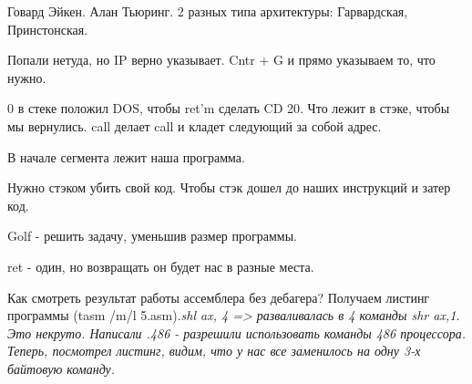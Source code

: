 \begin{rem}Говард Эйкен. Алан Тьюринг. 2 разных типа архитектуры: Гарвардская, Принстонская. \end{rem}


Попали нетуда, но IP верно указывает. Cntr + G и прямо указываем то, что нужно. 

0 в стеке положил DOS, чтобы ret'm сделать CD 20. Что лежит в стэке, чтобы мы вернулись. call делает call и кладет следующий за собой адрес.	

В начале сегмента лежит наша программа.

\begin{hw}Нужно стэком убить свой код. Чтобы стэк дошел до наших инструкций и затер код.\end{hw}

Golf - решить задачу, уменьшив размер программы. 

ret - один, но возвращать он будет нас в разные места.

Как смотреть результат работы ассемблера без дебагера? 	Получаем листинг программы (tasm /m/l 5.asm).\slshape shl ax, 4 \upshape => разваливалась в 4 команды \slshape shr ax,1\upshape. Это некруто. Написали .486 - разрешили использовать команды 486 процессора. Теперь, посмотрел листинг, видим, что у нас все заменилось на одну 3-х байтовую команду.

